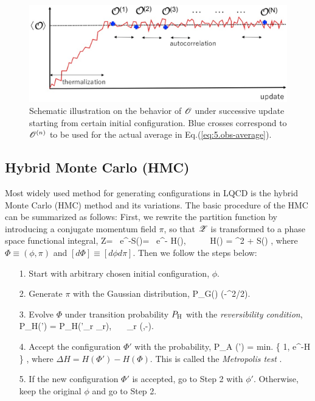  
\begin{figure}[t]
\begin{center}
\includegraphics[scale=0.37]{Chapter3-figures/auto.eps} 
 \end{center}
\caption{Schematic illustration on the behavior of ${\cal O}$ under successive update starting from
certain initial configuration. Blue crosses correspond to ${\cal O}^{(n)}$ to be used for the actual average in
Eq.(\ref{eq:5.obs-average}).}
\label{fig:auto}
\end{figure}
    
    
    
\subsection{Hybrid Monte Carlo (HMC)}

 Most widely used method   for 
  generating configurations in LQCD 
  is  the hybrid Monte Carlo (HMC) method \cite{Duane:1987de} and its variations.
 The basic procedure of the HMC can be summarized as follows:
 First, we rewrite the partition function by introducing a conjugate momentum field $\pi$,
 so that ${\cal Z}$ is transformed to a phase space functional integral,
\beq
{\cal Z}= \int [d\phi]\ e^{-S(\phi)}= \int [d\Phi] \  e^{- H(\Phi)}, \ \  \ \ \ 
H(\Phi) =  \pi^2 + S(\phi) ,
\eeq
where $\Phi\equiv(\phi,\pi)$ and $[d\Phi]\equiv [d\phi d\pi]$.
Then we follow the steps below:
 \begin{enumerate}
 \item[1.]   Start with arbitrary chosen initial configuration, $\phi$.
 \item[2.]  Generate $\pi$ with the Gaussian distribution, 
 \beq 
 P_{\rm G}(\pi) \propto \exp(-\pi^2/2).
 \eeq
\item[3.]  Evolve $\Phi $ under transition probability $P_{\rm H}$ with the {\it reversibility condition}, 
\beq
\label{eq:reversible}
P_{\rm H}(\Phi \rightarrow \Phi') = P_{\rm H}(\Phi'_r \rightarrow \Phi_r),   \ \ \  \Phi_r \equiv (\phi,-\pi). 
\eeq
\item[4.] Accept the configuration $\Phi'$ with the probability, 
\beq 
\label{eq:MET-test}
P_{\rm A} (\Phi \rightarrow \Phi')  = {\rm min.} \{ 1, e^{-\Delta H} \} ,
\eeq
where  $\Delta H=H(\Phi')- H(\Phi)$.  This is called the {\it Metropolis test}  \cite{Metropolis_1953}.
\item[5.] If the new configuration $\Phi'$ is accepted, go to Step 2 with $\phi'$.
 Otherwise, keep the original $\phi$ and go to Step 2. 
\end{enumerate}

